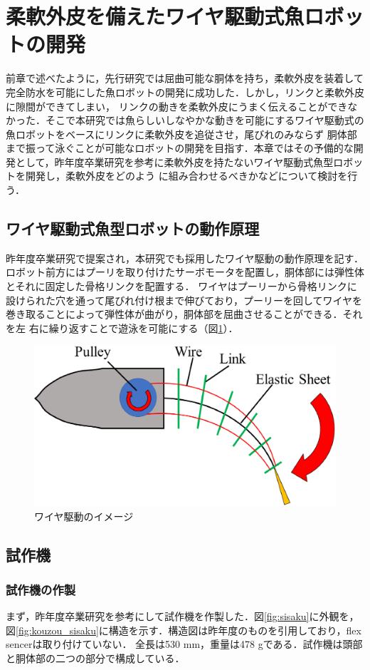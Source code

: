 \newpage
\section{柔軟外皮を備えたワイヤ駆動式魚ロボットの開発}
前章で述べたように，先行研究\cite{kyu}では屈曲可能な胴体を持ち，柔軟外皮を装着して完全防水を可能にした魚ロボットの開発に成功した．しかし，リンクと柔軟外皮に隙間ができてしまい，
リンクの動きを柔軟外皮にうまく伝えることができなかった．そこで本研究では魚らしいしなやかな動きを可能にするワイヤ駆動式の魚ロボットをベースにリンクに柔軟外皮を追従させ，尾びれのみならず
胴体部まで振って泳ぐことが可能なロボットの開発を目指す．本章ではその予備的な開発として，昨年度卒業研究を参考に柔軟外皮を持たないワイヤ駆動式魚型ロボットを開発し，柔軟外皮をどのよう
に組み合わせるべきかなどについて検討を行う．
\subsection{ワイヤ駆動式魚型ロボットの動作原理}
昨年度卒業研究で提案され，本研究でも採用したワイヤ駆動の動作原理を記す．ロボット前方にはプーリを取り付けたサーボモータを配置し，胴体部には弾性体とそれに固定した骨格リンクを配置する．
ワイヤはプーリーから骨格リンクに設けられた穴を通って尾びれ付け根まで伸びており，プーリーを回してワイヤを巻き取ることによって弾性体が曲がり，胴体部を屈曲させることができる．それを左
右に繰り返すことで遊泳を可能にする（図\ref{fig:waiyakudou}）．

\begin{figure}[b]
   \centering
   \includegraphics[width=0.6\linewidth]{chapters/picture/waiyakudou.eps}
   \caption{ワイヤ駆動のイメージ}
   \label{fig:waiyakudou}
\end{figure}

\subsection{試作機}
\subsubsection{試作機の作製}
まず，昨年度卒業研究を参考にして試作機を作製した．図\ref{fig:sisaku}に外観を，図\ref{fig:kouzou_sisaku}に構造を示す．構造図は昨年度のものを引用しており，flex sencerは取り付けていない．
全長は530 mm，重量は478 gである．試作機は頭部と胴体部の二つの部分で構成している．

